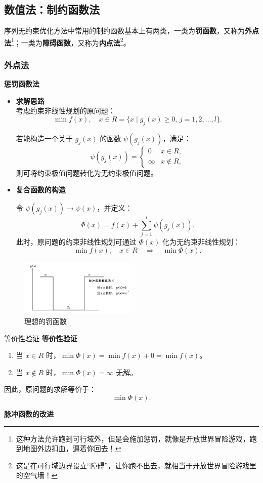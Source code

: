 \subsection{数值法：制约函数法}
\label{sec:制约函数法}
序列无约束优化方法中常用的制约函数基本上有两类，一类为\textbf{罚函数}，又称为\textbf{外点法}\footnote{这种方法允许跑到可行域外，但是会施加惩罚，就像是开放世界冒险游戏，跑到地图外边扣血，逼着你回去！}；一类为\textbf{障碍函数}，又称为\textbf{内点法}\footnote{这是在可行域边界设立“障碍”，让你跑不出去，就相当于开放世界冒险游戏里的空气墙！}。
\subsubsection{外点法}
\begin{notebox}{\textbf{惩罚函数法}}{}
    \begin{itemize}
    \item \textbf{求解思路}
    \\考虑约束非线性规划的原问题：
    \[
    \min f(x), \quad x \in R = \{ x \mid g_j(x) \geq 0, \, j = 1, 2, \ldots, l \}.
    \]
    
    若能构造一个关于 \( g_j(x) \) 的函数 \(\psi(g_j(x))\)，满足：
    \[
    \psi(g_j(x)) = 
    \begin{cases} 
        0 & x \in R, \\ 
        \infty & x \notin R,
    \end{cases}
    \]
    则可将约束极值问题转化为无约束极值问题。
    \item \textbf{复合函数的构造}

    令 \(\psi(g_j(x)) \to \psi(x)\)，并定义：
    \[
    \Phi(x) = f(x) + \sum_{j=1}^l \psi(g_j(x)).
    \]
    此时，原问题的约束非线性规划可通过 \(\Phi(x)\) 化为无约束非线性规划：
    \[
    \min f(x), \quad x \in R \quad \Rightarrow \quad \min \Phi(x).
    \]
\end{itemize}
\end{notebox}
\begin{figure}[H]
    \centering
    \includegraphics[width=0.5\textwidth]{./image/24.png}
    \caption{理想的罚函数}
    \label{fig:Chapter4_Temporary_Pavilion_1}
\end{figure}
\begin{thmbox}{等价性验证}{}
\textbf{等价性验证}
    \begin{enumerate}
        \item 当 \( x \in R \) 时，\(\min \Phi(x) = \min f(x) + 0 = \min f(x)\)。
        \item 当 \( x \notin R \) 时，\(\min \Phi(x) = \infty\) 无解。
    \end{enumerate}
因此，原问题的求解等价于：
    \[
    \min \Phi(x).
    \]
\end{thmbox}
    \textbf{脉冲函数的改进}

